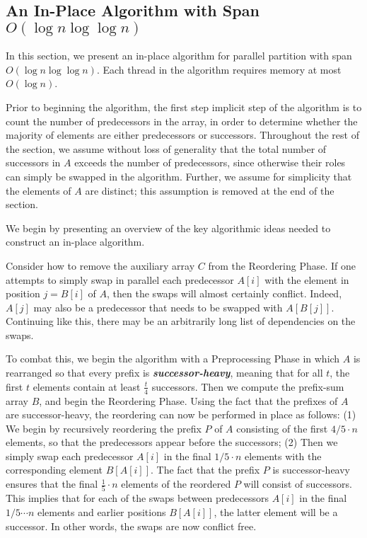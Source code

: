 \documentclass[sigplan, 10pt, nonacm]{acmart}
\newcommand{\defn}[1]{{\textit{\textbf{\boldmath #1}}}}
\renewcommand{\paragraph}[1]{\vspace{0.09in}\noindent{\bf \boldmath #1.}}
\theoremstyle{remark}
\theoremstyle{remark}
\begin{document}
\clearpage
\begin{appendices}


\section{An In-Place Algorithm with Span $O(\log n \log \log n)$}\label{secalg}

In this section, we present an in-place algorithm for parallel
partition with span $O(\log n \log \log n)$. Each thread in the
algorithm requires memory at most $O(\log n)$.

Prior to beginning the algorithm, the first step implicit step of the
algorithm is to count the number of predecessors in the array, in
order to determine whether the majority of elements are either
predecessors or successors. Throughout the rest of the section, we
assume without loss of generality that the total number of successors
in $A$ exceeds the number of predecessors, since otherwise their roles
can simply be swapped in the algorithm. Further, we assume for
simplicity that the elements of $A$ are distinct; this assumption is
removed at the end of the section.


\paragraph{Algorithm Outline}
We begin by presenting an overview of the key algorithmic ideas needed
to construct an in-place algorithm.

Consider how to remove the auxiliary array $C$ from the Reordering
Phase. If one attempts to simply swap in parallel each predecessor
$A[i]$ with the element in position $j = B[i]$ of $A$, then the swaps
will almost certainly conflict. Indeed, $A[j]$ may also be a
predecessor that needs to be swapped with $A[B[j]]$. Continuing like
this, there may be an arbitrarily long list of dependencies on the
swaps.

To combat this, we begin the algorithm with a Preprocessing Phase in
which $A$ is rearranged so that every prefix is
\defn{successor-heavy}, meaning that for all $t$, the first $t$
elements contain at least $\frac{t}{4}$ successors. Then we compute
the prefix-sum array $B$, and begin the Reordering Phase. Using the
fact that the prefixes of $A$ are successor-heavy, the reordering can
now be performed in place as follows: (1) We begin by recursively
reordering the prefix $P$ of $A$ consisting of the first $4/5 \cdot n$
elements, so that the predecessors appear before the successors; (2)
Then we simply swap each predecessor $A[i]$ in the final $1/5 \cdot n$
elements with the corresponding element $B[A[i]]$. The fact that the
prefix $P$ is successor-heavy ensures that the final $\frac{1}{5}
\cdot n$ elements of the reordered $P$ will consist of
successors. This implies that for each of the swaps between
predecessors $A[i]$ in the final $1/5 \cdots n$ elements and earlier
positions $B[A[i]]$, the latter element will be a successor. In other
words, the swaps are now conflict free.


\end{appendices}
\end{document}

